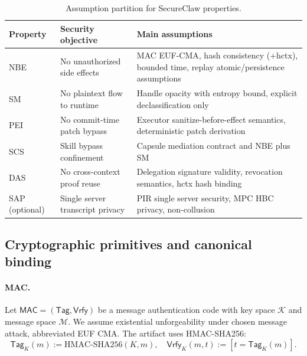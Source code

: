 \begin{table}[h]
\centering
\small
\begin{tabular}{lll}
\toprule
Property & Security objective & Main assumptions \\
\midrule
NBE & No unauthorized side effects & MAC EUF-CMA, hash consistency (+hctx), bounded time, replay atomic/persistence assumptions \\
SM & No plaintext flow to runtime & Handle opacity with entropy bound, explicit declassification only \\
PEI & No commit-time patch bypass & Executor sanitize-before-effect semantics, deterministic patch derivation \\
SCS & Skill bypass confinement & Capsule mediation contract and NBE plus SM \\
DAS & No cross-context proof reuse & Delegation signature validity, revocation semantics, hctx hash binding \\
SAP (optional) & Single server transcript privacy & PIR single server security, MPC HBC privacy, non-collusion \\
\bottomrule
\end{tabular}
\caption{Assumption partition for SecureClaw properties.}
\label{tab:assumption-partition}
\end{table}

\subsection{Cryptographic primitives and canonical binding}
\label{app:proofs:primitives}

\paragraph{MAC.}
Let $\mathsf{MAC} = (\mathsf{Tag},\mathsf{Vrfy})$ be a message authentication code with key space
$\mathcal{K}$ and message space $\mathcal{M}$. We assume existential unforgeability under chosen
message attack, abbreviated EUF CMA. The artifact uses HMAC-SHA256:
\[
\mathsf{Tag}_K(m) := \mathrm{HMAC\text{-}SHA256}(K, m), \quad \mathsf{Vrfy}_K(m,t) := [t = \mathsf{Tag}_K(m)].
\]

